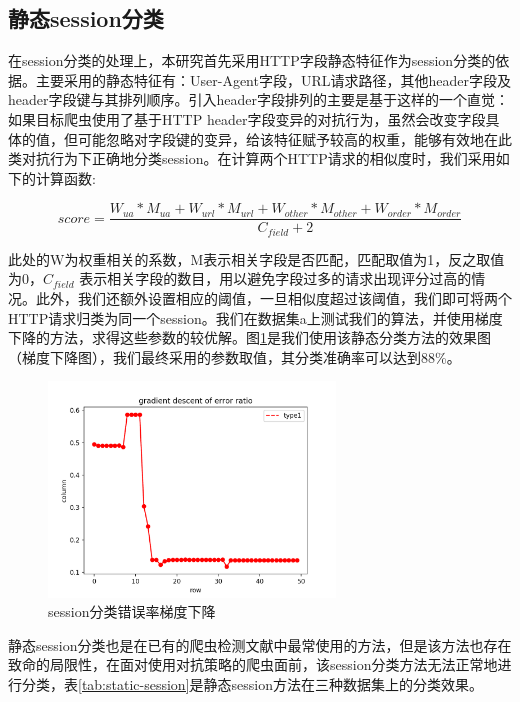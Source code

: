 \documentclass[doctor,privacy,twoside]{buaa_mac}
\begin{document}
\subsection{静态session分类}
在session分类的处理上，本研究首先采用HTTP字段静态特征作为session分类的依据。主要采用的静态特征有：User-Agent字段，URL请求路径，其他header字段及header字段键与其排列顺序。引入header字段排列的主要是基于这样的一个直觉：如果目标爬虫使用了基于HTTP header字段变异的对抗行为，虽然会改变字段具体的值，但可能忽略对字段键的变异，给该特征赋予较高的权重，能够有效地在此类对抗行为下正确地分类session。在计算两个HTTP请求的相似度时，我们采用如下的计算函数:

\begin{equation}
score = \frac {W_{ua} * M_{ua} + W_{url} * M_{url} + W_{other} * M_{other} + W_{order} * M_{order}} {C_{field} + 2}
\end{equation}


此处的W为权重相关的系数，M表示相关字段是否匹配，匹配取值为1，反之取值为0，$C_{field}$ 表示相关字段的数目，用以避免字段过多的请求出现评分过高的情况。此外，我们还额外设置相应的阈值，一旦相似度超过该阈值，我们即可将两个HTTP请求归类为同一个session。我们在数据集a上测试我们的算法，并使用梯度下降的方法，求得这些参数的较优解。图\ref{fig:gradient}是我们使用该静态分类方法的效果图（梯度下降图），我们最终采用的参数取值，其分类准确率可以达到88\%。

\centerline{}
\begin{figure}[!h]
  \centering
  \includegraphics[width=0.68\textwidth]{images/gradient_descent.png}
  \caption{session分类错误率梯度下降}
  \label{fig:gradient}
\end{figure}
\centerline{}

静态session分类也是在已有的爬虫检测文献中最常使用的方法，但是该方法也存在致命的局限性，在面对使用对抗策略的爬虫面前，该session分类方法无法正常地进行分类，表\ref{tab:static-session}是静态session方法在三种数据集上的分类效果。
\end{document}
